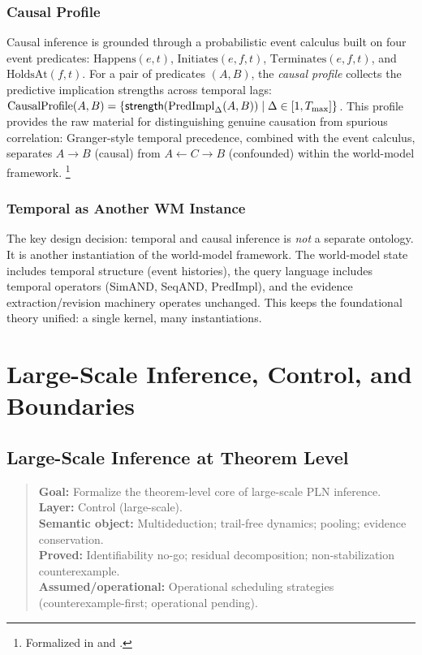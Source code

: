 \documentclass[11pt,openany]{report}
\begin{document}
\section{Causal Profile}

Causal inference is grounded through a probabilistic event calculus
built on four event predicates: $\mathrm{Happens}(e, t)$,
$\mathrm{Initiates}(e, f, t)$, $\mathrm{Terminates}(e, f, t)$, and
$\mathrm{HoldsAt}(f, t)$.  For a pair of predicates $(A, B)$, the
\emph{causal profile} collects the predictive implication strengths across
temporal lags:
$\mathrm{CausalProfile}(A, B) = \{\mathsf{strength}(\mathrm{PredImpl}_\Delta(A, B))
\mid \Delta \in [1, T_{\max}]\}$.  This profile provides the raw material
for distinguishing genuine causation from spurious correlation:
Granger-style temporal precedence, combined with the event calculus,
separates $A \to B$ (causal) from $A \leftarrow C \to B$ (confounded)
within the world-model framework.%
\footnote{Formalized in  and
  .}

\section{Temporal as Another WM Instance}

The key design decision: temporal and causal inference is \emph{not} a
separate ontology.  It is another instantiation of the world-model
framework.  The world-model state includes temporal structure (event
histories), the query language includes temporal operators (SimAND,
SeqAND, PredImpl), and the evidence extraction/revision machinery
operates unchanged.  This keeps the foundational theory unified:
a single kernel, many instantiations.


\part{Large-Scale Inference, Control, and Boundaries}
\label{part:large-scale}

\chapter{Large-Scale Inference at Theorem Level}
\label{ch:large-scale}

\begin{quote}\small
\textbf{Goal:} Formalize the theorem-level core of large-scale PLN inference.\\
\textbf{Layer:} Control (large-scale).\\
\textbf{Semantic object:} Multideduction; trail-free dynamics; pooling; evidence conservation.\\
\textbf{Proved:} Identifiability no-go; residual decomposition; non-stabilization counterexample.\\
\textbf{Assumed/operational:} Operational scheduling strategies (counterexample-first; operational pending).
\end{quote}
\end{document}
